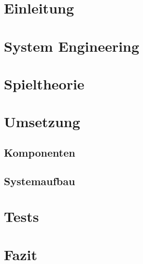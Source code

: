 \documentclass{report}
\begin{document}
\section{Einleitung}
\section{System Engineering}

\vspace{-4mm}
\section{Spieltheorie}
%

\section{Umsetzung}
%
\subsection{Komponenten}
%
\subsection{Systemaufbau}
%
\section{Tests}
%
\section{Fazit}
%


\newpage
\setlength{\cftbeforelottitleskip}{0pt} %
\setlength{\cftafterlottitleskip}{15pt} %
\listoftables
{}  %

\renewcommand{\bibname}{Quellenverzeichnis}
\printbibliography[title={Quellenverzeichnis}]

\appendix

\end{document}
